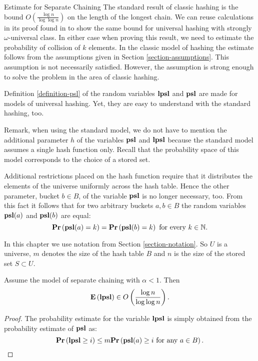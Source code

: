 \begin{section}{Estimate for Separate Chaining}
The standard result of classic hashing is the bound $O\left(\frac{\log n}{\log \log n}\right)$ on the length of the longest chain. We can reuse calculations in its proof found in \cite{DBLP:books/sp/Mehlhorn84} to show the same bound for universal hashing with strongly $\omega$-universal class. In either case when proving this result, we need to estimate the probability of collision of $k$ elements. In the classic model of hashing the estimate follows from the assumptions given in Section \ref{section-assumptions}. This assumption is not necessarily satisfied. However, the assumption is strong enough to solve the problem in the area of classic hashing. 

Definition \ref{definition-psl} of the random variables $\mathbf{lpsl}$ and $\mathbf{psl}$ are made for models of universal hashing. Yet, they are easy to understand with the standard hashing, too. 

Remark, when using the standard model, we do not have to mention the additional parameter $h$ of the variables $\mathbf{psl}$ and $\mathbf{lpsl}$ because the standard model assumes a single hash function only. Recall that the probability space of this model corresponds to the choice of a stored set. 

Additional restrictions placed on the hash function require that it distributes the elements of the universe uniformly across the hash table. Hence the other parameter, bucket $b \in B$, of the variable $\mathbf{psl}$ is no longer necessary, too. From this fact it follows that for two arbitrary buckets $a, b \in B$ the random variables $\mathbf{psl}(a)$ and $\mathbf{psl}(b)$ are equal: \[\mathbf{Pr}\left(\mathbf{psl}(a) = k\right) = \mathbf{Pr}\left(\mathbf{psl}(b) = k\right) \text{ for every } k \in \mathbb{N} \text{.}\] 

In this chapter we use notation from Section \ref{section-notation}. So $U$ is a universe, $m$ denotes the size of the hash table $B$ and $n$ is the size of the stored set $S \subset U$.

\begin{theorem}
Assume the model of separate chaining with $\alpha < 1$. Then 
\[
\mathbf{E}\left(\mathbf{lpsl}\right) \in O\left(\frac{\log n}{\log \log n}\right) \text{.}
\]
\end{theorem}
\begin{proof}
The probability estimate for the variable $\mathbf{lpsl}$ is simply obtained from the probability estimate of $\mathbf{psl}$ as:
\begin{displaymath}
\mathbf{Pr}\left(\mathbf{lpsl} \geq i\right) \leq m \mathbf{Pr}\left(\mathbf{psl}(a) \geq i \text{ for any } a \in B\right) \text{.}
\end{displaymath}


\end{proof}
\end{section}
